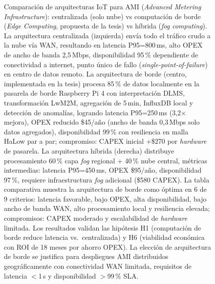 \begin{figure}[H]
\caption{Comparación de arquitecturas IoT para AMI (\textit{Advanced Metering Infrastructure}): centralizada (solo nube) vs computación de borde (\textit{Edge Computing}, propuesta de la tesis) vs híbrida (\textit{fog computing}). La arquitectura centralizada (izquierda) envía todo el tráfico crudo a la nube vía WAN, resultando en latencia P95=800\,ms, alto OPEX de ancho de banda 2{,}5\,Mbps, disponibilidad 95\,\% dependiente de conectividad a internet, punto único de fallo (\textit{single-point-of-failure}) en centro de datos remoto. La arquitectura de borde (centro, implementada en la tesis) procesa 85\,\% de datos localmente en la pasarela de borde Raspberry Pi 4 con interpretación DLMS, transformación LwM2M, agregación de 5\,min, InfluxDB local y detección de anomalías, logrando latencia P95=250\,ms (3{,}2$\times$ mejora), OPEX reducido \$45/año (ancho de banda 0{,}3\,Mbps solo datos agregados), disponibilidad 99\,\% con resiliencia en malla HaLow par a par; compromiso: CAPEX inicial +\$270 por \textit{hardware} de pasarela. La arquitectura híbrida (derecha) distribuye procesamiento 60\,\% capa \textit{fog} regional + 40\,\% nube central, métricas intermedias: latencia P95=450\,ms, OPEX \$95/año, disponibilidad 97\,\%, requiere infraestructura \textit{fog} adicional (\$580 CAPEX). La tabla comparativa muestra la arquitectura de borde como óptima en 6 de 9 criterios: latencia favorable, bajo OPEX, alta disponibilidad, bajo ancho de banda WAN, alto procesamiento local y resiliencia elevada; compromisos: CAPEX moderado y escalabilidad de \textit{hardware} limitada. Los resultados validan las hipótesis H1 (computación de borde reduce latencia vs.\ centralizada) y H6 (viabilidad económica con ROI de 18 meses por ahorro OPEX). La elección de arquitectura de borde se justifica para despliegues AMI distribuidos geográficamente con conectividad WAN limitada, requisitos de latencia $<$1\,s y disponibilidad $>$99\,\% SLA.}
\label{fig:architecture-comparison}
\end{figure}
